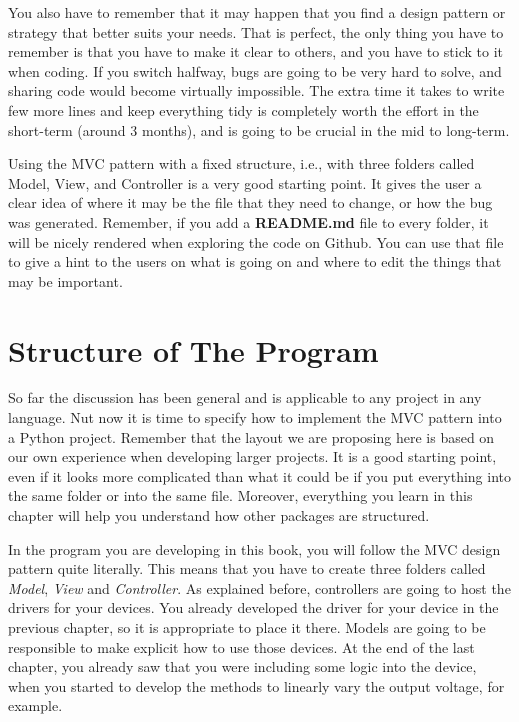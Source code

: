 You also have to remember that it may happen that you find a design
pattern or strategy that better suits your needs. That is perfect, the
only thing you have to remember is that you have to make it clear to
others, and you have to stick to it when coding. If you switch halfway,
bugs are going to be very hard to solve, and sharing code would become
virtually impossible. The extra time it takes to write few more lines
and keep everything tidy is completely worth the effort in the
short-term (around 3 months), and is going to be crucial in the mid
to long-term.

Using the {MVC} pattern with a fixed structure, i.e., with three folders
called Model, View, and Controller is a very good starting point. It
gives the user a clear idea of where it may be the file that they need
to change, or how the bug was generated. Remember, if you add a
\textbf{{README}.md} file to every folder, it will be nicely rendered
when exploring the code on Github. You can use that file to give a hint
to the users on what is going on and where to edit the things that may
be important.

\section{Structure of The Program}\label{structure-of-theprogram}
So far the discussion has been general and is applicable to any project
in any language. Nut now it is time to specify how to implement the
{MVC} pattern into a Python project. Remember that the layout we are
proposing here is based on our own experience when developing larger
projects. It is a good starting point, even if it looks more complicated
than what it could be if you put everything into the same folder or into
the same file. Moreover, everything you learn in this chapter will help
you understand how other packages are structured.

In the program you are developing in this book, you will follow the
{MVC} design pattern quite literally. This means that you have to create
three folders called \emph{Model}, \emph{View} and
\emph{Controller}. As explained before, controllers are going to host
the drivers for your devices. You already developed the driver for your
device in the previous chapter, so it is appropriate to place it there.
Models are going to be responsible to make explicit how to use those
devices. At the end of the last chapter, you already saw that you were
including some logic into the device, when you started to develop the
methods to linearly vary the output voltage, for example.

